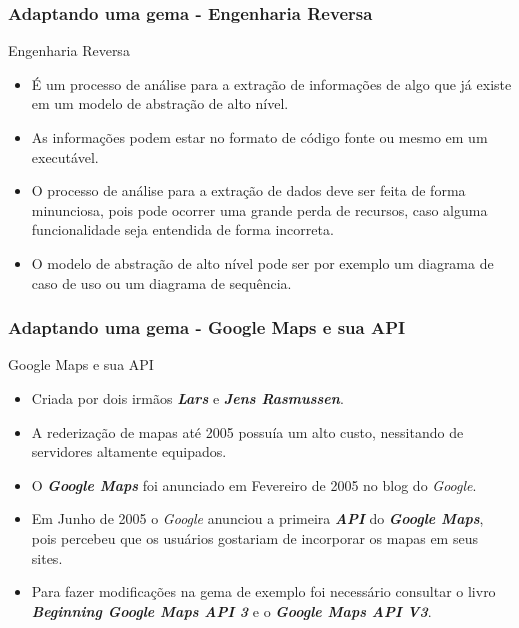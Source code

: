 \begin{frame}
\frametitle{Adaptando uma gema - Engenharia Reversa}

  \begin{block}{Engenharia Reversa}

   \begin{itemize}

    \item É um processo de análise para a extração de informações de algo que já
    existe em um modelo de abstração de alto nível.

    \item As informações podem estar no formato de código fonte ou mesmo em um executável.

    \item O processo de análise para a extração de dados deve ser feita de forma
    minunciosa, pois pode ocorrer uma grande perda de recursos, caso alguma funcionalidade seja entendida de
    forma incorreta.

    \item O modelo de abstração de alto nível pode ser por exemplo um diagrama de caso de uso ou
    um diagrama de sequência.

   \end{itemize}

  \end{block}

\end{frame}


\begin{frame}
\frametitle{Adaptando uma gema - Google Maps e sua API}

  \begin{block}{Google Maps e sua API}

   \begin{itemize}

    \item Criada por dois irmãos \emph{\textbf{Lars}} e \emph{\textbf{Jens Rasmussen}}.

    \item A rederização de mapas até 2005 possuía um alto custo, nessitando de servidores altamente equipados.

    \item O \emph{\textbf{Google Maps}} foi anunciado em Fevereiro de 2005 no blog do \emph{Google}.

    \item Em Junho de 2005 o \emph{Google} anunciou a primeira \emph{\textbf{API}} do \emph{\textbf{Google Maps}},
    pois percebeu que os usuários gostariam de incorporar os mapas em seus sites.

    \item Para fazer modificações na gema de exemplo foi necessário consultar o livro
    \emph{\textbf{Beginning Google Maps API 3}} e o \emph{\textbf{Google Maps API V3}}.

   \end{itemize}

  \end{block}

\end{frame}


